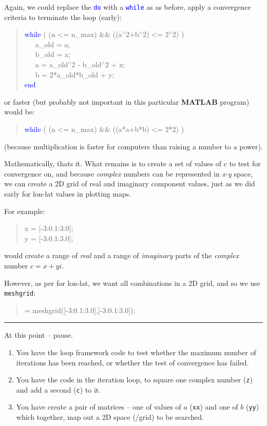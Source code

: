 \documentclass{tufte-book} %
\newenvironment{docspec}{\begin{quotation}\ttfamily\parskip0pt\parindent0pt\ignorespaces}{\end{quotation}}
\begin{document}
Again, we could replace the \texttt{\textcolor{blue}{do}} with a \texttt{\textcolor{blue}{while}} as as before, apply a convergence criteria to terminate the loop (early):
\begin{docspec}
\textcolor{blue}{while} ( (n <= n\_max) \&\& ((a\(^{\wedge}\)2+b\(^{\wedge}\)2) <= 2\(^{\wedge}\)2) )\\
\ \ \ a\_old = a;\\
\ \ \ b\_old = a;\\
\ \ \ a = a\_old\(^{\wedge}\)2 - b\_old\(^{\wedge}\)2 + x;\\
\ \ \ b = 2*a\_old*b\_old + y;\\
\textcolor{blue}{end}
\end{docspec}
or faster (but probably not important in this particular \textbf{MATLAB} program) would be:
\begin{docspec}
\textcolor{blue}{while} ( (n <= n\_max) \&\& ((a*a+b*b) <= 2*2) )
\end{docspec}
(because multiplication is faster for computers than raising a number to a power).

Mathematically, thats it. What remains is to create a set of values of \(c\) to test for convergence on, and because \textit{complex} numbers can be represented in \textit{x-y} space, we can create a 2D grid of real and imaginary component values, just as we did early for lon-lat values in plotting maps. 

\pagebreak

For example:
\begin{docspec}
x = [-3:0.1:3.0];\\
y = [-3:0.1:3.0];
\end{docspec}
would create a range of \textit{real} and a range of \textit{imaginary} parts of the \textit{complex} number \(c=x+yi\).

However, as per for lon-lat, we want all combinations in a 2D grid, and so we use \texttt{meshgrid}:
\begin{docspec}
[xx, yy] = meshgrid([-3:0.1:3.0],[-3:0.1:3.0]);
\end{docspec}

\vspace{1mm}
\noindent\rule{4cm}{0.5pt}
\vspace{2mm}

\noindent At this point -- pause.

\begin{enumerate}[noitemsep]
\item You have the loop framework code to test whether the maximum number of iterations has been reached, or whether the test of convergence has failed.
\item You have the code in the iteration loop, to square one complex number (\texttt{z}) and add a second (\texttt{c}) to it.
\item You have create a pair of matrices -- one of values of \(a\) (\texttt{xx}) and one of \(b\) (\texttt{yy}) which together, map out a 2D  space (/grid) to be searched.
\end{enumerate}
\end{document}
